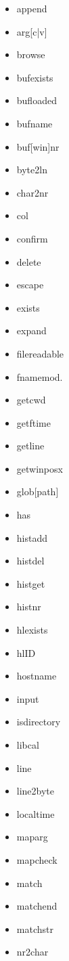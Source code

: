 \begin{multicols}{3}
\scriptsize
\begin{itemize}[label={}]
    \item append
    \item arg[c|v]
    \item browse
    \item bufexists
    \item bufloaded
    \item bufname
    \item buf[win]nr
    \item byte2ln
    \item char2nr
    \item col
    \item confirm
    \item delete
    \item escape
    \item exists
    \item expand
    \item filereadable
    \item fnamemod.
    \item getcwd
    \item getftime
    \item getline
    \item getwinposx
    \item glob[path]
    \item has
    \item histadd
    \item histdel
    \item histget
    \item histnr
    \item hlexists
    \item hlID
    \item hostname
    \item input
    \item isdirectory
    \item libcal
    \item line
    \item line2byte
    \item localtime
    \item maparg
    \item mapcheck
    \item match
    \item matchend
    \item matchstr
    \item nr2char

\end{itemize}
\end{multicols}
